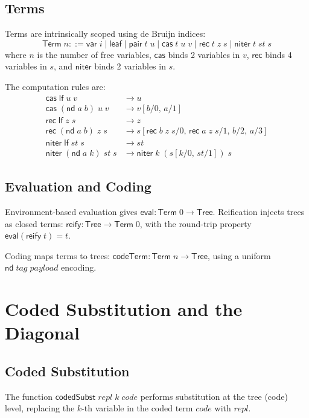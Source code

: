 \documentclass[11pt]{article}
\newcommand{\lf}{\mathsf{lf}}
\newcommand{\nd}{\mathsf{nd}}
\newcommand{\cas}{\mathsf{cas}}
\newcommand{\rec}{\mathsf{rec}}
\newcommand{\niter}{\mathsf{niter}}
\newcommand{\eval}{\mathsf{eval}}
\newcommand{\reify}{\mathsf{reify}}
\newcommand{\codeTerm}{\mathsf{codeTerm}}
\newcommand{\codedSubst}{\mathsf{codedSubst}}
\newcommand{\Tree}{\mathsf{Tree}}
\newcommand{\Term}{\mathsf{Term}}
\begin{document}
\subsection{Terms}

Terms are intrinsically scoped using de Bruijn indices:
\[
  \Term\;n ::= \mathsf{var}\;i \mid \mathsf{leaf} \mid \mathsf{pair}\;t\;u
    \mid \cas\;t\;u\;v \mid \rec\;t\;z\;s \mid \niter\;t\;\mathit{st}\;s
\]
where $n$ is the number of free variables, $\cas$ binds 2 variables in $v$,
$\rec$ binds 4 variables in $s$, and $\niter$ binds 2 variables in $s$.

The computation rules are:
\begin{align*}
  \cas\;\lf\;u\;v &\to u \\
  \cas\;(\nd\;a\;b)\;u\;v &\to v[b/0,\, a/1] \\
  \rec\;\lf\;z\;s &\to z \\
  \rec\;(\nd\;a\;b)\;z\;s &\to s[\rec\;b\;z\;s/0,\, \rec\;a\;z\;s/1,\, b/2,\, a/3] \\
  \niter\;\lf\;\mathit{st}\;s &\to \mathit{st} \\
  \niter\;(\nd\;a\;k)\;\mathit{st}\;s &\to \niter\;k\;(s[k/0,\,\mathit{st}/1])\;s
\end{align*}

\subsection{Evaluation and Coding}

Environment-based evaluation gives $\eval : \Term\;0 \to \Tree$.
Reification injects trees as closed terms: $\reify : \Tree \to \Term\;0$,
with the round-trip property $\eval(\reify\;t) = t$.

Coding maps terms to trees: $\codeTerm : \Term\;n \to \Tree$, using a
uniform $\nd\;\mathit{tag}\;\mathit{payload}$ encoding.

\section{Coded Substitution and the Diagonal}

\subsection{Coded Substitution}

The function $\codedSubst\;\mathit{repl}\;k\;\mathit{code}$ performs substitution
at the tree (code) level, replacing the $k$-th variable in the coded term
$\mathit{code}$ with $\mathit{repl}$.
\end{document}

